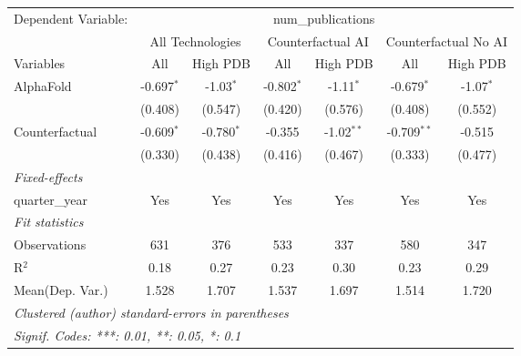 \begingroup
\centering
\begin{tabular}{lcccccc}
   \tabularnewline \midrule \midrule
   Dependent Variable: & \multicolumn{6}{c}{num\_publications}\\
 & \multicolumn{2}{c}{All Technologies} & \multicolumn{2}{c}{Counterfactual AI} & \multicolumn{2}{c}{Counterfactual No AI} \\
\cmidrule(lr){1-1}\cmidrule(lr){2-3} \cmidrule(lr){4-5} \cmidrule(lr){6-7}
Variables & \multicolumn{1}{c}{All} & \multicolumn{1}{c}{High PDB} & \multicolumn{1}{c}{All} & \multicolumn{1}{c}{High PDB} & \multicolumn{1}{c}{All} & \multicolumn{1}{c}{High PDB} \\
\cmidrule(lr){1-1}\cmidrule(lr){2-2} \cmidrule(lr){3-3} \cmidrule(lr){4-4} \cmidrule(lr){5-5} \cmidrule(lr){6-6} \cmidrule(lr){7-7}
   AlphaFold      & -0.697$^{*}$ & -1.03$^{*}$  & -0.802$^{*}$ & -1.11$^{*}$  & -0.679$^{*}$  & -1.07$^{*}$\\   
                  & (0.408)      & (0.547)      & (0.420)      & (0.576)      & (0.408)       & (0.552)\\   
   Counterfactual & -0.609$^{*}$ & -0.780$^{*}$ & -0.355       & -1.02$^{**}$ & -0.709$^{**}$ & -0.515\\   
                  & (0.330)      & (0.438)      & (0.416)      & (0.467)      & (0.333)       & (0.477)\\   
   \midrule
   \emph{Fixed-effects}\\
   quarter\_year  & Yes          & Yes          & Yes          & Yes          & Yes           & Yes\\  
   \midrule
   \emph{Fit statistics}\\
   Observations   & 631          & 376          & 533          & 337          & 580           & 347\\  
   R$^2$          & 0.18         & 0.27         & 0.23         & 0.30         & 0.23          & 0.29\\  
Mean(Dep. Var.) & 1.528 & 1.707 & 1.537 & 1.697 & 1.514 & 1.720 \\
   \midrule \midrule
   \multicolumn{7}{l}{\emph{Clustered (author) standard-errors in parentheses}}\\
   \multicolumn{7}{l}{\emph{Signif. Codes: ***: 0.01, **: 0.05, *: 0.1}}\\
\end{tabular}
\par\endgroup
